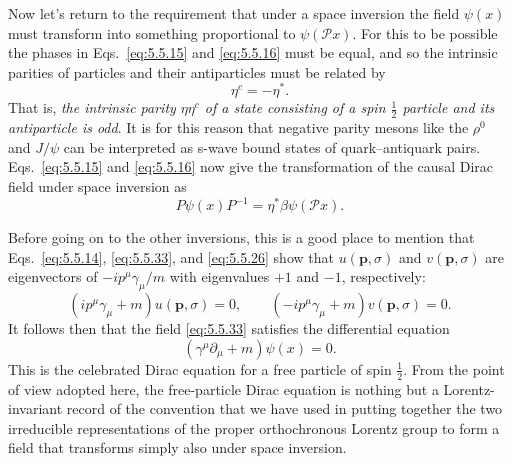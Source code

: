 Now let's return to the requirement that under a space inversion the field
$\psi(x)$ must transform into something proportional to $\psi(\mathcal P x)$.
For this to be possible the phases in Eqs.~\eqref{eq:5.5.15} and \eqref{eq:5.5.16} must be
equal, and so the intrinsic parities of particles and their antiparticles must
be related by
\begin{equation}
\eta^c=-\eta^*.
\tag{5.5.40}\label{eq:5.5.40}
\end{equation}
That is, \emph{the intrinsic parity $\eta\eta^c$ of a state consisting of a
spin $\frac12$ particle and its antiparticle is odd}. It is for this reason
that negative parity mesons like the $\rho^0$ and $J/\psi$ can be interpreted
as s-wave bound states of quark--antiquark pairs. Eqs.~\eqref{eq:5.5.15} and \eqref{eq:5.5.16}
now give the transformation of the causal Dirac field under space inversion as
\begin{equation}
P\psi(x)P^{-1}=\eta^*\beta\psi(\mathcal P x).
\tag{5.5.41}\label{eq:5.5.41}
\end{equation}

Before going on to the other inversions, this is a good place to mention that
Eqs.~\eqref{eq:5.5.14}, \eqref{eq:5.5.33}, and \eqref{eq:5.5.26} show that $u(\mathbf p,\sigma)$ and
$v(\mathbf p,\sigma)$ are eigenvectors of $-ip^\mu\gamma_\mu/m$ with
eigenvalues $+1$ and $-1$, respectively:
\begin{equation}
(ip^\mu\gamma_\mu+m)u(\mathbf p,\sigma)=0,
\qquad
(-ip^\mu\gamma_\mu+m)v(\mathbf p,\sigma)=0.
\tag{5.5.42}\label{eq:5.5.42}
\end{equation}
It follows then that the field \eqref{eq:5.5.33} satisfies the differential equation
\begin{equation}
(\gamma^\mu\partial_\mu+m)\psi(x)=0.
\tag{5.5.43}\label{eq:5.5.43}
\end{equation}
This is the celebrated Dirac equation for a free particle of spin $\frac12$.
From the point of view adopted here, the free-particle Dirac equation is
nothing but a Lorentz-invariant record of the convention that we have used in
putting together the two irreducible representations of the proper
orthochronous Lorentz group to form a field that transforms simply also under
space inversion.

